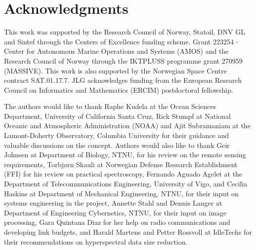 \section*{Acknowledgments}
This work was supported by the Research Council of Norway, Statoil, DNV GL and Sintef through the Centers of Excellence funding scheme, Grant 223254 - Center for Autonomous Marine Operations and Systems (AMOS) and the Research Council of Norway through the IKTPLUSS programme grant 270959 (MASSIVE). This work is also supported by the Norwegian Space Centre contract SAT.01.17.7. JLG acknowledges funding from the European Research Council on Informatics and Mathematics (ERCIM) postdoctoral fellowship.

The authors would like to thank Raphe Kudela at the Ocean Sciences Department, University of California Santa Cruz, Rick Stumpf at National Oceanic and Atmospheric Administration (NOAA) and Ajit Subramaniam at the Lamont-Doherty Observatory, Columbia University for their guidance and valuable discussions on the concept. Authors would also like to thank Geir Johnsen at Department of Biology, NTNU, for his review on the remote sensing requirements, Torbjørn Skauli at Norwegian Defense Research Establishment (FFI) for his review on  practical spectroscopy, Fernando Aguado Agelet at the Department of Telecommunications Engineering, University of Vigo, and Cecilia Haskins at Department of Mechanical Engineering, NTNU, for their input on systems engineering in the project, Annette Stahl and Dennis Langer at Department of Engineering Cybernetics, NTNU, for their input on image processing, Gara Quintana Diaz for her help on radio communications and developing link budgets, and Harald Martens and Petter Rossvoll at IdleTechs for their recommendations on hyperspectral data size reduction. 
